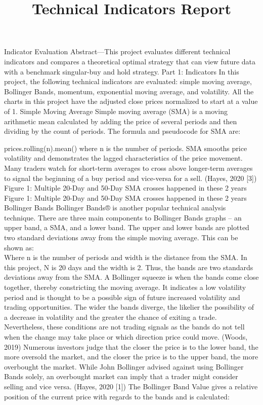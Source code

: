 \documentclass{article}
\begin{document}
\title{Technical Indicators Report}
\author{}
\date{}
\maketitle

Indicator Evaluation
Abstract—This project evaluates different technical indicators and compares a theoretical optimal strategy that can view future data with a benchmark singular-buy and hold strategy.
Part 1: Indicators
In this project, the following technical indicators are evaluated: simple moving average, Bollinger Bands, momentum, exponential moving average, and volatility.
All the charts in this project have the adjusted close prices normalized to start at a value of 1.
Simple Moving Average
Simple moving average (SMA) is a moving arithmetic mean calculated by adding the price of several periods and then dividing by the count of periods. The formula and pseudocode for SMA are:
 
prices.rolling(n).mean()
where n is the number of periods.
SMA smooths price volatility and demonstrates the lagged characteristics of the price movement. Many traders watch for short-term averages to cross above longer-term averages to signal the beginning of a buy period and vice-versa for a sell. (Hayes, 2020 [3])
Figure 1: Multiple 20-Day and 50-Day SMA crosses happened in these 2 years
Figure 1: Multiple 20-Day and 50-Day SMA crosses happened in these 2 years
Bollinger Bands
Bollinger Bands® is another popular technical analysis technique. There are three main components to Bollinger Bands graphs – an upper band, a SMA, and a lower band. The upper and lower bands are plotted two standard deviations away from the simple moving average. This can be shown as:\\

Where n is the number of periods and width is the distance from the SMA.
In this project, N is 20 days and the width is 2. Thus, the bands are two standards deviations away from the SMA.
A Bollinger squeeze is when the bands come close together, thereby constricting the moving average. It indicates a low volatility period and is thought to be a possible sign of future increased volatility and trading opportunities. The wider the bands diverge, the likelier the possibility of a decrease in volatility and the greater the chance of exiting a trade. Nevertheless, these conditions are not trading signals as the bands do not tell when the change may take place or which direction price could move. (Woods, 2019)
Numerous investors judge that the closer the price is to the lower band, the more oversold the market, and the closer the price is to the upper band, the more overbought the market. While John Bollinger advised against using Bollinger Bands solely, an overbought market can imply that a trader might consider selling and vice versa. (Hayes, 2020 [1])
The Bollinger Band Value gives a relative position of the current price with regards to the bands and is calculated:
 
\end{document}
